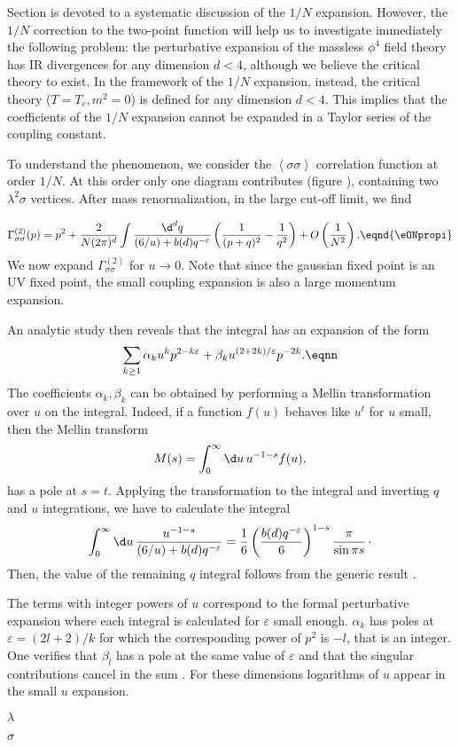 Section \label{\sssfivNRT} is devoted to a systematic discussion of the $1/N$
expansion. However, the $1/N$ correction to
the two-point function will help us to investigate  immediately
the following problem: the perturbative expansion of the massless $\phi^4$ field theory has IR divergences for any dimension $d<4$, although we believe the critical theory to exist.
In the framework of the $1/N$ expansion, instead, the critical theory ($T=T_c, m^2=0$) is defined for any dimension $d<4$. This
implies that the coefficients of the $1/N$ expansion cannot be expanded in
a Taylor series of the coupling constant. \par
To understand the phenomenon, we consider the
$\left<\sigma\sigma\right>$
correlation function at order $1/N$.  At this order only one diagram
contributes (figure \label{\figbubiii}), containing two $\lambda^2\sigma$ vertices.
After mass renormalization,   in the  large cut-off limit, we find \sslbl\ssNplarge \par
$$\Gamma^{(2)}_{\sigma\sigma}(p)= p^2 +{2\over N (2\pi)^{d}}\int
{\d^{d}q \over(6/u)+b(d)q^{-\varepsilon}}\left({1 \over
(p+q)^2} -{1 \over q^2}\right) +O\left({1 \over N^2}\right)
. \eqnd{\eONpropi} $$
We now expand $\Gamma^{(2)}_{\sigma\sigma}$ for $u\to0$.
Note that since the gaussian fixed point is an UV fixed
point, the small coupling expansion is also a large momentum
expansion. \par
An analytic study  then reveals that the integral has an expansion of the form
$$\sum_{k\ge 1} \alpha_k u^k p^{2-k\varepsilon}+\beta_k
u^{(2+2k)/\varepsilon} p^{-2k} .\eqnn $$
The coefficients $\alpha_k,\beta_k$ can be obtained by performing a Mellin
transformation over $u$ on the integral. Indeed, if a function $f(u)$
behaves like $u^t$ for $u$ small, then the Mellin transform
$$M(s)=\int_0^\infty\d u\,u^{-1-s}f(u), $$
has a pole at $s=t$. Applying the transformation to the
integral  and inverting $q$ and $u$ integrations, we have to calculate
the integral
$$\int_0^\infty\d
u\,{u^{-1-s}\over(6/u)+b(d)q^{-\varepsilon}}
={1\over 6}\left(b(d)q^{-\varepsilon}\over
6\right)^{1-s}{\pi
\over \sin\pi s}\,\cdot $$
Then, the value of the remaining $q$ integral follows from the generic
result \eqns{\eintmunu}.\par
The terms with integer powers of $u$ correspond to the formal
perturbative expansion where each integral is calculated for
$\varepsilon$ small enough. $\alpha_k$
has poles at $\varepsilon=(2l+2)/k$ for which  the corresponding power of
$p^2$ is $-l$, that is an integer. One verifies that $\beta_l$ has a pole at
the same value of $\varepsilon$ and that the singular contributions cancel in
the sum \rSymanza. For these dimensions logarithms of $u$ appear in the small $u$ expansion.
\midinsert
{}
\centerline{}
\centerline{$\lambda$}
\centerline{$\sigma$}
\figlbl\figbubiii
\endinsert
%
